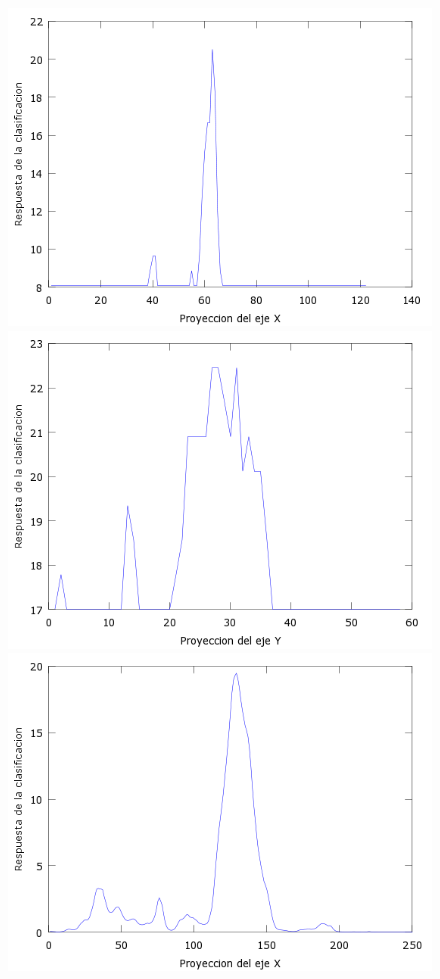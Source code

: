 \begin{figure}[H]
  \centering
  \includegraphics[scale=.4]{images/plots/boost7X}
  \includegraphics[scale=.4]{images/plots/boost7Y}
  \includegraphics[scale=.4]{images/plots/svm7X}

\end{figure}
